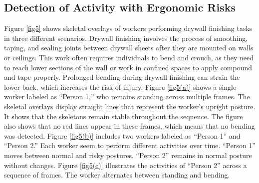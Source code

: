 \documentclass[11pt]{article}
\begin{document}
\subsection{Detection of Activity with Ergonomic Risks}


Figure \ref{fig5} shows skeletal overlays of workers performing drywall finishing tasks in three different scenarios. Drywall finishing involves the process of smoothing, taping, and sealing joints between drywall sheets after they are mounted on walls or ceilings. This work often requires individuals to bend and crouch, as they need to reach lower sections of the wall or work in confined spaces to apply compound and tape properly. Prolonged bending during drywall finishing can strain the lower back, which increases the risk of injury. Figure \ref{fig5(a)} shows a single worker labeled as ``Person 1,'' who remains standing across multiple frames. The skeletal overlays display straight lines that represent the worker’s upright posture. It shows that the skeletons remain stable throughout the sequence. The figure also shows that no red lines appear in these frames, which means that no bending was detected. Figure \ref{fig5(b)} includes two workers labeled as ``Person 1'' and ``Person 2.'' Each worker seem to perform different activities over time. ``Person 1'' moves between normal and risky postures. ``Person 2'' remains in normal posture without changes. Figure \ref{fig5(c)} illustrates the activities of ``Person 2'' across a sequence of frames. The worker alternates between standing and bending. 
\end{document}
